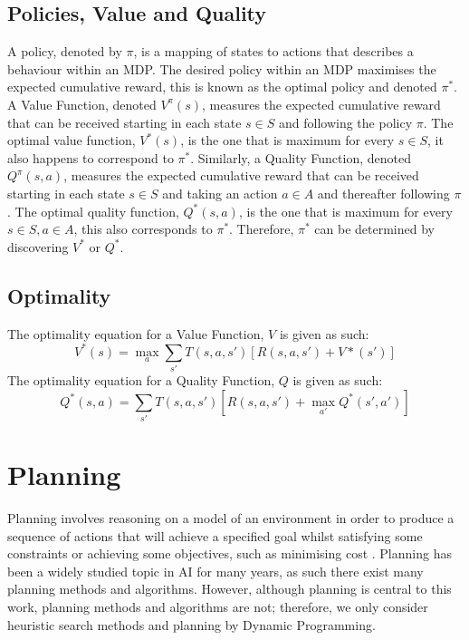 \subsection{Policies, Value and Quality}
A policy, denoted by $\pi$, is a mapping of states to actions that describes a behaviour within an MDP. The desired policy within an MDP maximises the expected cumulative reward, this is known as the optimal policy and denoted $\pi^*$.
A Value Function, denoted $V^\pi(s)$, measures the expected cumulative reward that can be received starting in each state $s \in S$ and following the policy $\pi$. The optimal value function, $V^*(s)$, is the one that is maximum for every $s \in S$, it also happens to correspond to $\pi^*$.
Similarly, a Quality Function, denoted $Q^\pi(s,a)$, measures the expected cumulative reward that can be received starting in each state $s \in S$ and taking an action $a \in A$ and thereafter following $\pi$. The optimal quality function, $Q^*(s,a)$, is the one that is maximum for every $s \in S, a \in A$, this also corresponds to $\pi^*$. Therefore, $\pi^*$ can be determined by discovering $V^*$ or $Q^*$.
\subsection{Optimality}
The optimality equation for a Value Function, $V$ is given as such:
\begin{equation}
\label{eqn:vstar}
    V^*(s) = \max_a\sum_{s'}T(s,a,s')[R(s,a,s')+V*(s')]
\end{equation}
The optimality equation for a Quality Function, $Q$ is given as such:
\begin{equation}
\label{eqn:qstar}
Q^*(s,a) = \sum_{s'}T(s,a,s')[R(s,a,s')+\max_{a'}Q^*(s',a')]
\end{equation}

\section{Planning}
Planning involves reasoning on a model of an environment in order to produce a sequence of actions that will achieve a specified goal whilst satisfying some constraints or achieving some objectives, such as minimising cost \citep{DBLP:books/aw/RN2020, Lav06, GhallabNauTraverso04}. 
Planning has been a widely studied topic in AI for many years, as such there exist many planning methods and algorithms. However, although planning is central to this work, planning methods and algorithms are not; therefore, we only consider heuristic search methods and planning by Dynamic Programming.

